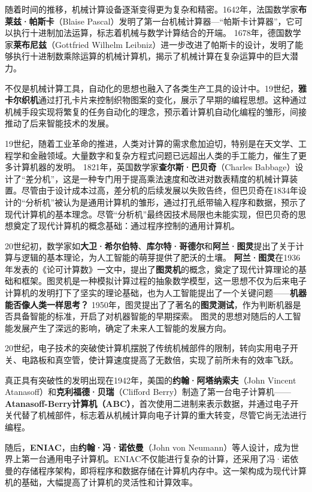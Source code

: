 随着时间的推移，机械计算设备逐渐变得更为复杂和精密。1642年，法国数学家{\bf 布莱兹·帕斯卡}（Blaise Pascal）发明了第一台机械计算器---“帕斯卡计算器”，它可以执行十进制加法运算，标志着机械与数学计算结合的开端。
1678年，德国数学家{\bf 莱布尼兹}（Gottfried Wilhelm Leibniz）进一步改进了帕斯卡的设计，发明了能够执行十进制数乘除运算的机械计算机，揭示了机械计算在复杂运算中的巨大潜力。

不仅是机械计算工具，自动化的思想也融入了各类生产工具的设计中。19世纪，{\bf 雅卡尔织机}通过打孔卡片来控制织物图案的变化，展示了早期的编程思想。这种通过机械手段实现将繁复的任务自动化的理念，预示着计算机自动化编程的雏形，间接推动了后来智能技术的发展。

19世纪，随着工业革命的推进，人类对计算的需求愈加迫切，特别是在天文学、工程学和金融领域。大量数字和复杂方程式问题已远超出人类的手工能力，催生了更多计算机器的发明。
1821年，英国数学家{\bf 查尔斯·巴贝奇}（Charles Babbage）设计了“差分机”，这是一种专门用于提高乘法速度和改进对数表精度的机械计算装置。尽管由于设计成本过高，差分机的后续发展以失败告终，但巴贝奇在1834年设计的“分析机”被认为是通用计算机的雏形，通过打孔纸带输入程序和数据，预示了现代计算机的基本理念。尽管“分析机”最终因技术局限也未能实现，但巴贝奇的思想奠定了现代计算机的概念基础：通过程序控制的通用计算机。

20世纪初，数学家如{\bf 大卫·希尔伯特}、{\bf 库尔特·哥德尔}和{\bf 阿兰·图灵}提出了关于计算与逻辑的基本理论，为人工智能的萌芽提供了肥沃的土壤。
{\bf 阿兰·图灵}在1936年发表的《论可计算数》一文中，提出了{\bf 图灵机}的概念，奠定了现代计算理论的基础和框架。图灵机是一种模拟计算过程的抽象数学模型，这一思想不仅为后来电子计算机的发明打下了坚实的理论基础，也为人工智能提出了一个关键问题——{\bf 机器能否像人类一样思考？} 1950年，图灵提出了了著名的{\bf 图灵测试}，作为判断机器是否具备智能的标准，开启了对机器智能的早期探索。
图灵的思想对随后的人工智能发展产生了深远的影响，确定了未来人工智能的发展方向。

20世纪，电子技术的突破使计算机摆脱了传统机械部件的限制，转向实用电子开关、电路板和真空管，使计算速度提高了无数倍，实现了前所未有的效率飞跃。

真正具有突破性的发明出现在1942年，美国的{\bf 约翰·阿塔纳索夫}（John Vincent Atanasoff）和{\bf 克利福德·贝瑞}（Clifford Berry）制造了第一台电子计算机——{\bf Atanasoff-Berry计算机（ABC）}，首次使用二进制来表示数据，并通过电子开关代替了机械部件，标志着从机械计算向电子计算的重大转变，尽管它尚无法进行编程。

随后，{\bf ENIAC}，由{\bf 约翰·冯·诺依曼}（John von Neumann）等人设计，成为世界上第一台通用电子计算机。ENIAC不仅能进行复杂的计算，还采用了冯·诺依曼的存储程序架构，即将程序和数据存储在计算机内存中。这一架构成为现代计算机的基础，大幅提高了计算机的灵活性和计算效率。

